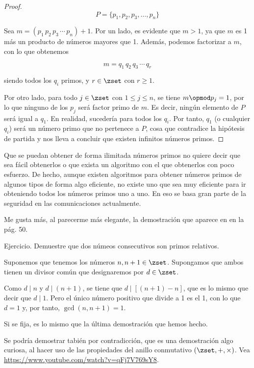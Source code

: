 \begin{proof}
  $$ P = \{p_1, p_2, p_3, \ldots, p_n\} $$

  Sea $m = (p_1 \, p_2 \, p_3 \, \cdots \, p_n) + 1$. Por un lado, es
  evidente que $m > 1$, ya que $m$ es 1 más un producto de números mayores
  que 1. Además, podemos factorizar a $m$, con lo que obtenemos

  $$ m = q_1 \, q_2 \, q_3 \, \cdots \, q_r $$

  \noindent siendo todos los $q_i$ primos, y $r \in \zset$ con $r \geq 1$.

  Por otro lado, para todo $j \in \zset$ con $1 \leq j \leq n$, se tiene $m
  \opmod p_j = 1$, por lo que ninguno de los $p_j$ será factor primo de $m$.
  Es decir, ningún elemento de $P$ será igual a $q_1$. En realidad,
  sucedería para todos los $q_i$. Por tanto, $q_1$ (o cualquier $q_i$) será
  un número primo que no pertenece a $P$, cosa que contradice la hipótesis
  de partida y nos lleva a concluir que existen infinitos números primos.
  \fi
\end{proof}

Que se puedan obtener de forma ilimitada números primos no quiere decir que
sea fácil obtenerlos o que exista un algoritmo con el que obtenerlos con
poco esfuerzo. De hecho, aunque existen algoritmos para obtener números
primos de algunos tipos de forma algo eficiente, no existe uno que sea muy
eficiente para ir obteniendo todos los números primos uno a uno. En eso se
basa gran parte de la seguridad en las comunicaciones actualmente.

Me gusta más, al parecerme más elegante, la demostración que aparece en
\cite{weissman} en la pág. 50.

Ejercicio. Demuestre que dos númeos consecutivos son primos relativos.

Suponemos que tenemos los números $n, n+1 \in \zset$. Supongamos que ambos
tienen un divisor común que designaremos por $d \in \zset$.

Como $d \mid n$ y $d \mid (n+1)$, se tiene que $d \mid [(n+1) - n]$, que es
lo mismo que decir que $d \mid 1$. Pero el único número positivo que divide
a 1 es el 1, con lo que $d = 1$ y, por tanto, $\gcd(n, n+1) = 1$.

Si se fija, es lo mismo que la última demostración que hemos hecho.

Se podría demostrar tabién por contradicción, que es una demostración algo
curiosa, al hacer uso de las propiedades del anillo conmutativo $(\zset, +,
\times)$. Vea \url{https://www.youtube.com/watch?v=qFj7V769sY8}.

